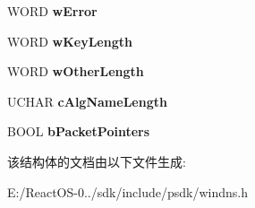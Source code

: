 \begin{DoxyCompactItemize}
W\+O\+RD {\bfseries w\+Error}
\item 
\mbox{\label{struct_d_n_s___t_k_e_y___d_a_t_a_w_ac71f47e351f54fcaf1b1cbb2f9140bac}} 
W\+O\+RD {\bfseries w\+Key\+Length}
\item 
\mbox{\label{struct_d_n_s___t_k_e_y___d_a_t_a_w_a6ec584dc205b4da6ad5669bf7b6912b1}} 
W\+O\+RD {\bfseries w\+Other\+Length}
\item 
\mbox{\label{struct_d_n_s___t_k_e_y___d_a_t_a_w_abee03ce3c9b676864219fc94e520cd72}} 
U\+C\+H\+AR {\bfseries c\+Alg\+Name\+Length}
\item 
\mbox{\label{struct_d_n_s___t_k_e_y___d_a_t_a_w_adac70a596882c25afc092485743ed8a6}} 
B\+O\+OL {\bfseries b\+Packet\+Pointers}
\end{DoxyCompactItemize}


该结构体的文档由以下文件生成\+:\begin{DoxyCompactItemize}
\item 
E\+:/\+React\+O\+S-\/0../sdk/include/psdk/windns.\+h\end{DoxyCompactItemize}
